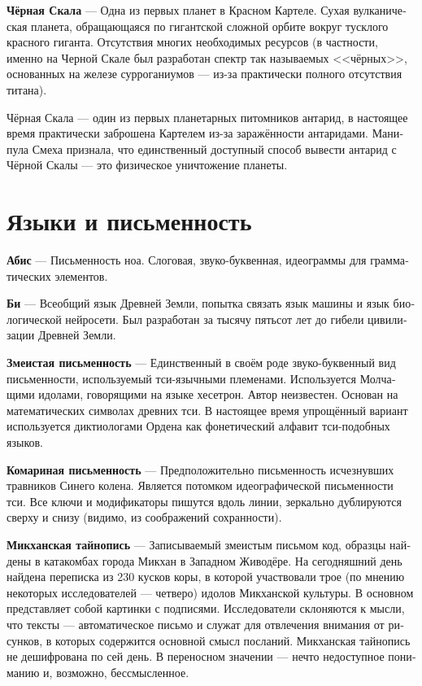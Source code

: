 \documentclass[a4paper,12pt,fleqn]{book}\usepackage{polyglossia}\setdefaultlanguage[babelshorthands=true]{russian}\setotherlanguage{english}\defaultfontfeatures{Ligatures=TeX,Mapping=tex-text}\usepackage{xcolor}\newcommand{\ml}[3]{#2}
\newcommand{\theterm}[3]{\textbf{\hypertarget{#1}{#2}} --- #3}
\begin{document}
\theterm{black-rock}
{Чёрная Скала}
{Одна из первых планет в Красном Картеле.
Сухая вулканическая планета, обращающаяся по гигантской сложной орбите вокруг тусклого красного гиганта.
Отсутствия многих необходимых ресурсов (в частности, именно на Черной Скале был разработан спектр так называемых <<чёрных>>, основанных на железе сурроганиумов --- из-за практически полного отсутствия титана).

Чёрная Скала --- один из первых планетарных питомников антарид, в настоящее время практически заброшена Картелем из-за заражённости антаридами.
Манипула Смеха признала, что единственный доступный способ вывести антарид с Чёрной Скалы --- это физическое уничтожение планеты.}

\chapter{Языки и письменность}

\theterm{abis}
{Абис}
{Письменность ноа.
Слоговая, звуко-буквенная, идеограммы для грамматических элементов.}

\theterm{bi}
{Би}
{Всеобщий язык Древней Земли, попытка связать язык машины и язык биологической нейросети.
Был разработан за тысячу пятьсот лет до гибели цивилизации Древней Земли.}

\theterm{snake-script}
{Змеистая письменность}
{Единственный в своём роде звуко-буквенный вид письменности, используемый тси-язычными племенами.
Используется Молчащими идолами, говорящими на языке хесетрон.
Автор неизвестен.
Основан на математических символах древних тси.
В настоящее время упрощённый вариант используется диктиологами Ордена как фонетический алфавит тси-подобных языков.}

\theterm{mosquito-script}
{Комариная письменность}
{Предположительно письменность исчезнувших травников Синего колена.
Является потомком идеографической письменности тси.
Все ключи и модификаторы пишутся вдоль линии, зеркально дублируются сверху и снизу (видимо, из соображений сохранности).}

\theterm{mikchan-cyphers}
{Микханская тайнопись}
{Записываемый змеистым письмом код, образцы найдены в катакомбах города Микхан в Западном Живодёре.
На сегодняшний день найдена переписка из 230 кусков коры, в которой участвовали трое (по мнению некоторых исследователей --- четверо) идолов Микханской культуры.
В основном представляет собой картинки с подписями.
Исследователи склоняются к мысли, что тексты --- автоматическое письмо и служат для отвлечения внимания от рисунков, в которых содержится основной смысл посланий.
Микханская тайнопись не дешифрована по сей день.
В переносном значении --- нечто недоступное пониманию и, возможно, бессмысленное.}
\end{document}
